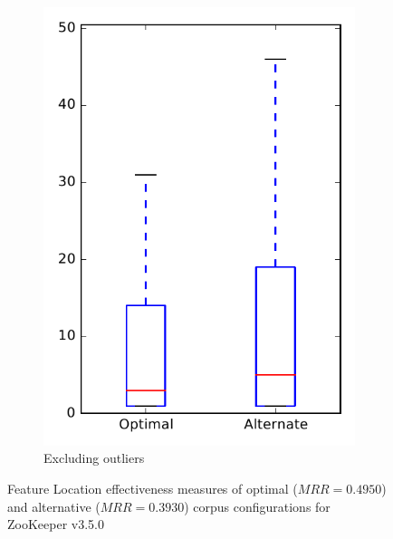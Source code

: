 \begin{figure}
\begin{subfigure}{.4\textwidth}
        \includegraphics[height=0.4\textheight]{figures/combo/flt_rq2_zookeeper_no_outlier}
        \caption{Excluding outliers}\label{fig:combo:flt:rq2:zookeeper_no_outlier}
    \end{subfigure}
\caption{Feature Location effectiveness measures of optimal ($MRR=0.4950$) and alternative ($MRR=0.3930$) corpus configurations for ZooKeeper v3.5.0}
\label{fig:combo:flt:rq2:zookeeper}
\end{figure}
